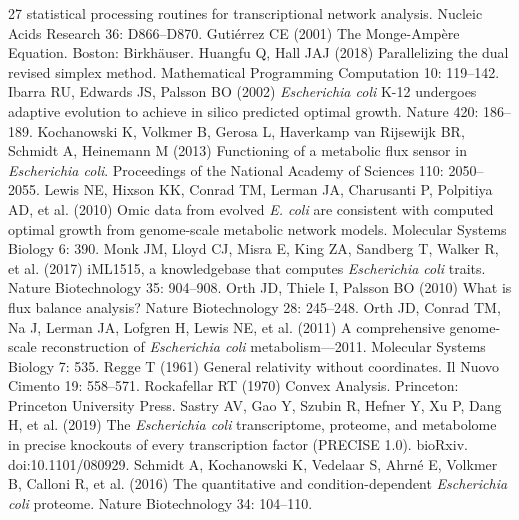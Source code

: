 \begin{thebibliography}{27}
             statistical processing routines for transcriptional network
             analysis. Nucleic Acids Research 36: D866--D870.
Guti{\'e}rrez CE (2001) The Monge-Amp{\`e}re Equation. Boston: Birkh{\"a}user.
Huangfu Q, Hall JAJ (2018) Parallelizing the dual revised simplex method. Mathematical Programming Computation 10: 119--142.
Ibarra RU, Edwards JS, Palsson BO (2002) \emph{Escherichia coli} {K-12} undergoes adaptive evolution to
             achieve in silico predicted optimal growth. Nature 420: 186--189.
Kochanowski K, Volkmer B, Gerosa L, Haverkamp van Rijsewijk BR, Schmidt A, Heinemann M (2013) Functioning of a metabolic flux sensor in \emph{Escherichia
             coli}. Proceedings of the National Academy of Sciences 110: 2050--2055.
Lewis NE, Hixson KK, Conrad TM, Lerman JA, Charusanti P, Polpitiya AD, et al. (2010) Omic data from evolved \emph{E. coli} are consistent with
             computed optimal growth from genome-scale metabolic network
             models. Molecular Systems Biology 6: 390.
Monk JM, Lloyd CJ, Misra E, King ZA, Sandberg T, Walker R, et al. (2017) i{ML1515}, a knowledgebase that computes \emph{Escherichia
             coli} traits. Nature Biotechnology 35: 904--908.
Orth JD, Thiele I, Palsson BO (2010) What is flux balance analysis? Nature Biotechnology 28: 245--248.
Orth JD, Conrad TM, Na J, Lerman JA, Lofgren H, Lewis NE, et al. (2011) A comprehensive genome-scale reconstruction of \emph{Escherichia coli} metabolism---2011. Molecular Systems Biology 7: 535.
Regge T (1961) General relativity without coordinates. Il Nuovo Cimento 19: 558--571.
Rockafellar RT (1970) Convex Analysis. Princeton: Princeton University Press.
Sastry AV, Gao Y, Szubin R, Hefner Y, Xu P, Dang H, et al. (2019) The \emph{Escherichia coli} transcriptome, proteome, and
             metabolome in precise knockouts of every transcription
             factor (PRECISE 1.0). bioRxiv. doi:10.1101/080929.
Schmidt A, Kochanowski K, Vedelaar S, Ahrn{\'e} E, Volkmer B, Calloni R, et al. (2016) The quantitative and condition-dependent \emph{Escherichia
             coli} proteome. Nature Biotechnology 34: 104--110.

\end{thebibliography}
